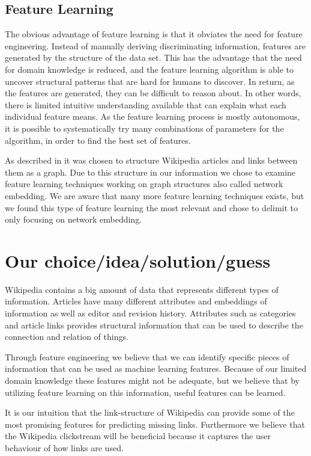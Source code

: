 \subsection{Feature Learning}
The obvious advantage of feature learning is that it obviates the need for feature engineering. Instead of manually deriving discriminating information, features are generated by the structure of the data set. This has the advantage that the need for domain knowledge is reduced, and the feature learning algorithm is able to uncover structural patterns that are hard for humans to discover. In return, as the features are generated, they can be difficult to reason about. In other words, there is limited intuitive understanding available that can explain what each individual feature means. As the feature learning process is mostly autonomous, it is possible to systematically try many combinations of parameters for the algorithm, in order to find the best set of features.

As described in  it was chosen to structure Wikipedia articles and links between them as a graph. Due to this structure in our information we chose to examine feature learning techniques working on graph structures also called network embedding.
We are aware that many more feature learning techniques exists, but we found this type of feature learning the most relevant and chose to delimit to only focusing on network embedding.

\section{Our choice/idea/solution/guess}
Wikipedia contains a big amount of data that represents different types of information. Articles have many different attributes and embeddings of information as well as editor and revision history. Attributes such as categories and article links provides structural information that can be used to describe the connection and relation of things.

Through feature engineering we believe that we can identify specific pieces of information that can be used as machine learning features. Because of our limited domain knowledge these features might not be adequate, but we believe that by utilizing feature learning on this information, useful features can be learned.

It is our intuition that the link-structure of Wikipedia can provide some of the most promising features for predicting missing links. Furthermore we believe that the Wikipedia clickstream will be beneficial because it captures the user behaviour of how links are used.

